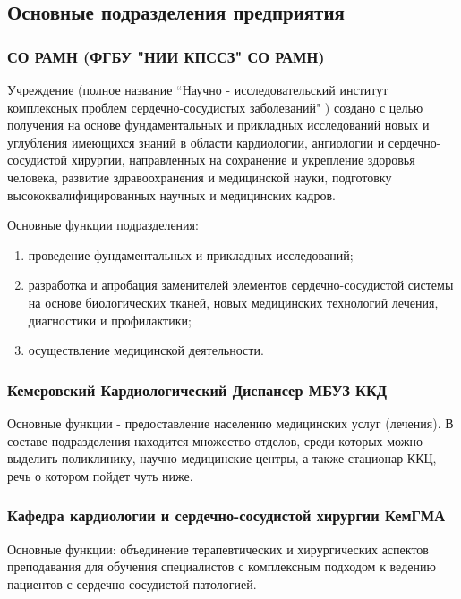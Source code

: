 \subsection{Основные подразделения предприятия}

\subsubsection{СО РАМН (ФГБУ "НИИ КПССЗ" СО РАМН)}
Учреждение (полное название “Научно - исследовательский институт комплексных
проблем сердечно-сосудистых заболеваний" ) создано с целью получения на основе
фундаментальных и прикладных исследований новых и углубления имеющихся знаний в
области  кардиологии, ангиологии и сердечно-сосудистой хирургии, направленных на
сохранение и укрепление здоровья человека, развитие здравоохранения и
медицинской науки, подготовку высококвалифицированных научных и медицинских
кадров.

Основные функции подразделения:
\begin{enumerate}
	\item проведение фундаментальных и прикладных исследований;
	\item разработка и апробация заменителей элементов сердечно-сосудистой системы
на основе биологических тканей, новых медицинских технологий лечения, 
диагностики и профилактики;
	\item осуществление медицинской деятельности.
\end{enumerate}

\subsubsection{Кемеровский Кардиологический Диспансер МБУЗ ККД}
Основные функции - предоставление населению медицинских услуг (лечения). В
составе подразделения находится множество отделов, среди которых можно выделить
поликлинику, научно-медицинские центры, а также стационар ККЦ, речь о котором
пойдет чуть ниже.

\subsubsection{Кафедра кардиологии и сердечно-сосудистой хирургии КемГМА}
Основные функции:  объединение терапевтических и хирургических аспектов
преподавания для обучения специалистов с комплексным подходом к ведению
пациентов с сердечно-сосудистой патологией.
